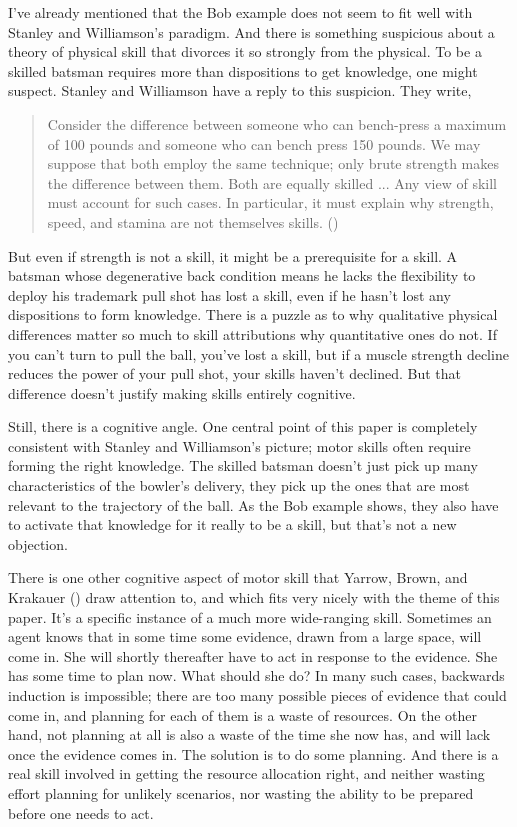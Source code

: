 \documentclass[
  11pt,
  letterpaper,
  DIV=11,
  numbers=noendperiod,
  twoside]{scrartcl}
\begin{document}
I've already mentioned that the Bob example does not seem to fit well
with Stanley and Williamson's paradigm. And there is something
suspicious about a theory of physical skill that divorces it so strongly
from the physical. To be a skilled batsman requires more than
dispositions to get knowledge, one might suspect. Stanley and Williamson
have a reply to this suspicion. They write,

\begin{quote}
Consider the difference between someone who can bench-press a maximum of
100 pounds and someone who can bench press 150 pounds. We may suppose
that both employ the same technique; only brute strength makes the
difference between them. Both are equally skilled ... Any view of skill
must account for such cases. In particular, it must explain why
strength, speed, and stamina are not themselves skills.
()
\end{quote}

But even if strength is not a skill, it might be a prerequisite for a
skill. A batsman whose degenerative back condition means he lacks the
flexibility to deploy his trademark pull shot has lost a skill, even if
he hasn't lost any dispositions to form knowledge. There is a puzzle as
to why qualitative physical differences matter so much to skill
attributions why quantitative ones do not. If you can't turn to pull the
ball, you've lost a skill, but if a muscle strength decline reduces the
power of your pull shot, your skills haven't declined. But that
difference doesn't justify making skills entirely cognitive.

Still, there is a cognitive angle. One central point of this paper is
completely consistent with Stanley and Williamson's picture; motor
skills often require forming the right knowledge. The skilled batsman
doesn't just pick up many characteristics of the bowler's delivery, they
pick up the ones that are most relevant to the trajectory of the ball.
As the Bob example shows, they also have to activate that knowledge for
it really to be a skill, but that's not a new objection.

There is one other cognitive aspect of motor skill that Yarrow, Brown,
and Krakauer () draw attention to, and
which fits very nicely with the theme of this paper. It's a specific
instance of a much more wide-ranging skill. Sometimes an agent knows
that in some time some evidence, drawn from a large space, will come in.
She will shortly thereafter have to act in response to the evidence. She
has some time to plan now. What should she do? In many such cases,
backwards induction is impossible; there are too many possible pieces of
evidence that could come in, and planning for each of them is a waste of
resources. On the other hand, not planning at all is also a waste of the
time she now has, and will lack once the evidence comes in. The solution
is to do some planning. And there is a real skill involved in getting
the resource allocation right, and neither wasting effort planning for
unlikely scenarios, nor wasting the ability to be prepared before one
needs to act.
\end{document}
